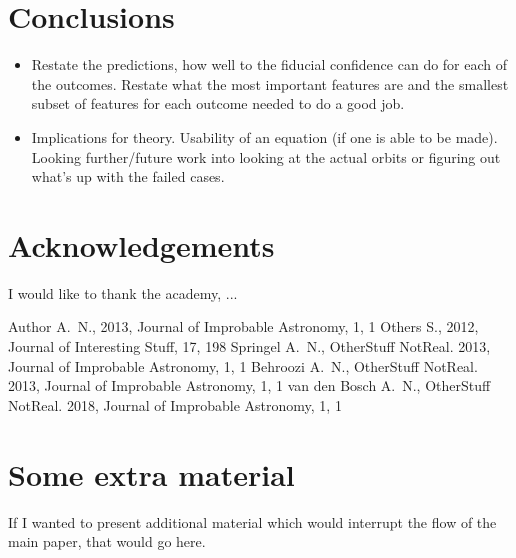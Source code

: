 \documentclass[fleqn,usenatbib]{mnras}
\begin{document}
\section{Conclusions}

\begin{itemize}
	\item Restate the predictions, how well to the fiducial confidence can do for each of the outcomes. Restate what the most important features are and the smallest subset of features for each outcome needed to do a good job.
	\item Implications for theory. Usability of an equation (if one is able to be made). Looking further/future work into looking at the actual orbits or figuring out what's up with the failed cases.
\end{itemize}

\section*{Acknowledgements}

I would like to thank the academy, ...




%


\begin{thebibliography}{99}
Author A.~N., 2013, Journal of Improbable Astronomy, 1, 1
Others S., 2012, Journal of Interesting Stuff, 17, 198
Springel A.~N., OtherStuff NotReal. 2013, Journal of Improbable Astronomy, 1, 1
Behroozi A.~N., OtherStuff NotReal. 2013, Journal of Improbable Astronomy, 1, 1
van den Bosch A.~N., OtherStuff NotReal. 2018, Journal of Improbable Astronomy, 1, 1
\end{thebibliography}



\appendix

\section{Some extra material}

If I wanted to present additional material which would interrupt the flow of the main paper, that would go here.



\bsp	%
\label{lastpage}
\end{document}
